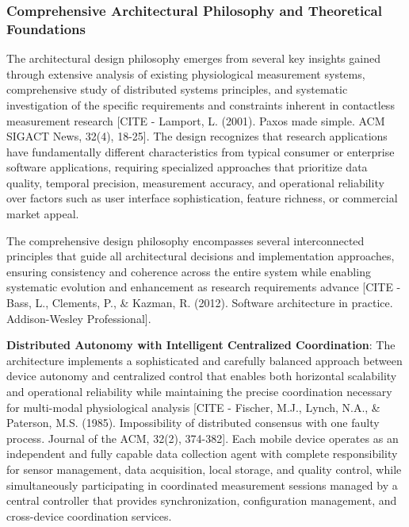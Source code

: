 \documentclass[11pt,a4paper]{report}
\begin{document}
\subsubsection{Comprehensive Architectural Philosophy and Theoretical Foundations}

The architectural design philosophy emerges from several key insights gained through extensive analysis of existing
physiological measurement systems, comprehensive study of distributed systems principles, and systematic investigation
of the specific requirements and constraints inherent in contactless measurement
research [CITE - Lamport, L. (2001). Paxos made simple. ACM SIGACT News, 32(4), 18-25]. The design recognizes that
research applications have fundamentally different characteristics from typical consumer or enterprise software
applications, requiring specialized approaches that prioritize data quality, temporal precision, measurement accuracy,
and operational reliability over factors such as user interface sophistication, feature richness, or commercial market
appeal.

The comprehensive design philosophy encompasses several interconnected principles that guide all architectural decisions
and implementation approaches, ensuring consistency and coherence across the entire system while enabling systematic
evolution and enhancement as research requirements
advance [CITE - Bass, L., Clements, P., \& Kazman, R. (2012). Software architecture in practice. Addison-Wesley Professional].

\textbf{Distributed Autonomy with Intelligent Centralized Coordination}: The architecture implements a sophisticated and
carefully balanced approach between device autonomy and centralized control that enables both horizontal scalability and
operational reliability while maintaining the precise coordination necessary for multi-modal physiological
analysis [CITE - Fischer, M.J., Lynch, N.A., \& Paterson, M.S. (1985). Impossibility of distributed consensus with one faulty process. Journal of the ACM, 32(2), 374-382].
Each mobile device operates as an independent and fully capable data collection agent with complete responsibility for
sensor management, data acquisition, local storage, and quality control, while simultaneously participating in
coordinated measurement sessions managed by a central controller that provides synchronization, configuration
management, and cross-device coordination services.
\end{document}
